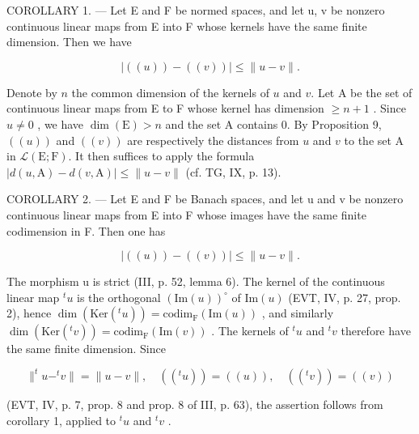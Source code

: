 COROLLARY 1. --- Let E and F be normed spaces, and let u, v be nonzero continuous linear maps from E into F whose kernels have the same finite dimension. Then we have

\[
\left| \left((u)\right) - ((v)) \right| \leqslant \| u - v \|.
\]

Denote by \(n\) the common dimension of the kernels of \(u\) and \(v\). Let A be the set of continuous linear maps from E to F whose kernel has dimension \(\geqslant n + 1\) . Since \(u \neq 0\) , we have \(\dim(\mathrm{E}) > n\) and the set A contains 0. By Proposition 9, \(((u))\) and \(((v))\) are respectively the distances from \(u\) and \(v\) to the set A in \(\mathcal{L}(\mathrm{E};\mathrm{F})\). It then suffices to apply the formula \(|d(u,\mathrm{A}) - d(v,\mathrm{A})| \leqslant \|u - v\|\) (cf. TG, IX, p. 13).

COROLLARY 2. --- Let E and F be Banach spaces, and let u and v be nonzero continuous linear maps from E into F whose images have the same finite codimension in F. Then one has

\[
| ((u)) - ((v)) | \leqslant \| u - v \|.
\]

The morphism u is strict (III, p. 52, lemma 6). The kernel of the continuous linear map \({}^{t}u\) is the orthogonal \((\mathrm{Im}(u))^{\circ}\) of \(\mathrm{Im}(u)\) (EVT, IV, p. 27, prop. 2), hence \(\dim(\mathrm{Ker}({}^{t}u)) = \mathrm{codim}_{\mathrm{F}}(\mathrm{Im}(u))\) , and similarly \(\dim(\mathrm{Ker}({}^{t}v)) = \mathrm{codim}_{\mathrm{F}}(\mathrm{Im}(v))\) . The kernels of \({}^{t}u\) and \({}^{t}v\) therefore have the same finite dimension. Since

\[
\| ^ {t} u - ^ {t} v \| = \| u - v \|, \quad ((^ {t} u)) = ((u)), \quad ((^ {t} v)) = ((v))
\]

(EVT, IV, p. 7, prop. 8 and prop. 8 of III, p. 63), the assertion follows from corollary 1, applied to \(^{t}u\) and \(^{t}v\) .

